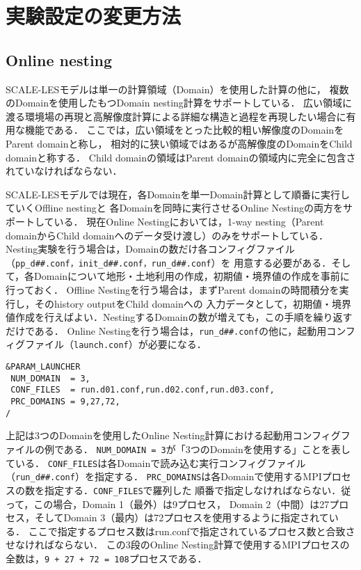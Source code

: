 \section{実験設定の変更方法}

\subsection{Online nesting}

SCALE-LESモデルは単一の計算領域（Domain）を使用した計算の他に，
複数のDomainを使用したもつDomain nesting計算をサポートしている．
広い領域に渡る環境場の再現と高解像度計算による詳細な構造と過程を再現したい場合に有用な機能である．
ここでは，広い領域をとった比較的粗い解像度のDomainをParent domainと称し，
相対的に狭い領域ではあるが高解像度のDomainをChild domainと称する．
Child domainの領域はParent domainの領域内に完全に包含されていなければならない．

SCALE-LESモデルでは現在，各Domainを単一Domain計算として順番に実行していくOffline nestingと
各Domainを同時に実行させるOnline Nestingの両方をサポートしている．
現在Online Nestingにおいては，1-way nesting（Parent domainからChild domainへのデータ受け渡し）のみをサポートしている．
Nesting実験を行う場合は，Domainの数だけ各コンフィグファイル（\verb|pp_d##.conf，init_d##.conf，run_d##.conf|）を
用意する必要がある．そして，各Domainについて地形・土地利用の作成，初期値・境界値の作成を事前に行っておく．
Offline Nestingを行う場合は，まずParent domainの時間積分を実行し，そのhistory outputをChild domainへの
入力データとして，初期値・境界値作成を行えばよい．NestingするDomainの数が増えても，この手順を繰り返すだけである．
Online Nestingを行う場合は，\verb|run_d##.conf|の他に，起動用コンフィグファイル（\verb|launch.conf|）が必要になる．

\vspace{0.5cm}
\begin{verbatim}
&PARAM_LAUNCHER
 NUM_DOMAIN  = 3,
 CONF_FILES  = run.d01.conf,run.d02.conf,run.d03.conf,
 PRC_DOMAINS = 9,27,72,
/
\end{verbatim}

上記は3つのDomainを使用したOnline Nesting計算における起動用コンフィグファイルの例である．
\verb|NUM_DOMAIN = 3|が「3つのDomainを使用する」ことを表している．
\verb|CONF_FILES|は各Domainで読み込む実行コンフィグファイル（\verb|run_d##.conf|）を指定する．
\verb|PRC_DOMAINS|は各Domainで使用するMPIプロセスの数を指定する．\verb|CONF_FILES|で羅列した
順番で指定しなければならない．従って，この場合，Domain 1（最外）は9プロセス，
Domain 2（中間）は27プロセス，そしてDomain 3（最内）は72プロセスを使用するように指定されている．
ここで指定するプロセス数はrun.confで指定されているプロセス数と合致させなければならない．
この3段のOnline Nesting計算で使用するMPIプロセスの全数は，\verb|9 + 27 + 72 = 108|プロセスである．

